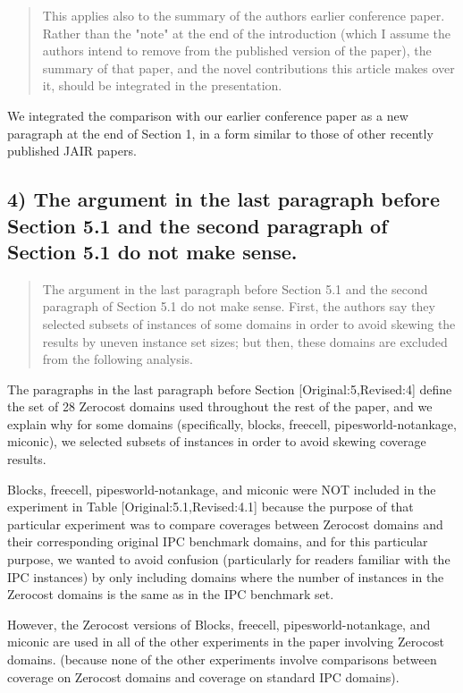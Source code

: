 \documentclass{article}
\begin{document}
\begin{quote}
 This applies also to the summary of the authors earlier conference
paper. Rather than the "note" at the end of the introduction (which I
assume the authors intend to remove from the published version of the
paper), the summary of that paper, and the novel contributions this
article makes over it, should be integrated in the presentation.
\end{quote}


We integrated the comparison with our earlier conference paper as a new paragraph at the end of Section 1, in a form similar to those of other recently published JAIR papers.

\subsection{4) The argument in the last paragraph before Section 5.1 and the second paragraph of Section 5.1 do not make sense.}
\label{sec:orgheadline29}

\begin{quote}
 The argument in the last paragraph before Section 5.1 and the second
paragraph of Section 5.1 do not make sense. First, the authors say
they selected subsets of instances of some domains in order to avoid
skewing the results by uneven instance set sizes; but then, these
domains are excluded from the following analysis.
\end{quote}

The paragraphs in the last paragraph before Section [Original:5,Revised:4]
define the set of 28 Zerocost
domains used throughout the rest of the paper, and we explain why for
some domains (specifically, blocks, freecell, pipesworld-notankage,
miconic), we selected subsets of instances in order to avoid skewing
coverage results.

Blocks, freecell, pipesworld-notankage, and miconic were NOT included in the experiment in Table [Original:5.1,Revised:4.1]
because the purpose of that particular experiment was to compare coverages between Zerocost domains and their corresponding original IPC benchmark domains, 
and for this particular purpose, we wanted to avoid confusion (particularly for readers familiar with the IPC instances) by only including
domains where the number of instances in the Zerocost domains is the same as in the IPC benchmark set.

However, the Zerocost versions of Blocks, freecell, pipesworld-notankage, and miconic are used in all of the other experiments in the paper involving Zerocost domains.
(because none of the other experiments involve comparisons between coverage on Zerocost domains and coverage on standard IPC domains).
\end{document}
